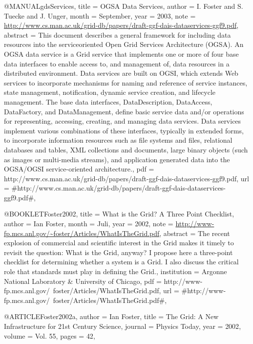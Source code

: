 @MANUAL{gdsServices,
  title = {{OGSA Data Services}},
  author = {I. Foster and S. Tuecke and J. Unger},
  month = {September},
  year = {2003},
  note = {\url{http://www.cs.man.ac.uk/grid-db/papers/draft-ggf-dais-dataservices-ggf9.pdf}},
  abstract = {This document describes a general framework for including data resources
	into the
serviceoriented Open Grid Services Architecture (OGSA).
	An OGSA data
service is a Grid service that implements one or more
	of four base data
interfaces to enable access to, and management
	of, data resources in a
distributed environment. Data services are
	built on OGSI, which extends Web
services to incorporate mechanisms
	for naming and reference of service
instances, state management,
	notification, dynamic service creation, and
lifecycle management.
	The base data interfaces, DataDescription,
DataAccess, DataFactory,
	and DataManagement, define basic service
data and/or operations for
	representing, accessing, creating, and
managing data services. Data
	services implement various combinations
of these interfaces, typically
	in extended forms, to incorporate
information resources such as file
	systems and files, relational
databases and tables, XML collections
	and documents, large binary
objects (such as images or multi-media
	streams), and application
generated data into the OGSA/OGSI service-oriented
	architecture.},
  pdf = {http://www.cs.man.ac.uk/grid-db/papers/draft-ggf-dais-dataservices-ggf9.pdf},
  url = {#http://www.cs.man.ac.uk/grid-db/papers/draft-ggf-dais-dataservices-ggf9.pdf#},
}

@BOOKLET{Foster2002,
  title = {{What is the Grid? A Three Point Checklist}},
  author = {Ian Foster},
  month = {Juli},
  year = {2002},
  note = {\url{http://www-fp.mcs.anl.gov/~foster/Articles/WhatIsTheGrid.pdf}},
  abstract = {The recent explosion of commercial
and scientific interest in the
	Grid makes it timely to revisit the
question: What is the Grid, anyway?
	I propose here a three-point
checklist for determining whether a
	system is a Grid. I also discuss
the critical role that standards
	must play in defining the Grid.},
  institution = {Argonne National Laboratory \& University of Chicago},
  pdf = {http://www-fp.mcs.anl.gov/~foster/Articles/WhatIsTheGrid.pdf},
  url = {#http://www-fp.mcs.anl.gov/~foster/Articles/WhatIsTheGrid.pdf#},
}

@ARTICLE{Foster2002a,
  author = {Ian Foster},
  title = {{The Grid: A New Infrastructure for 21st Century Science}},
  journal = {Physics Today},
  year = {2002},
  volume = {Vol. 55},
  pages = {42},
}

